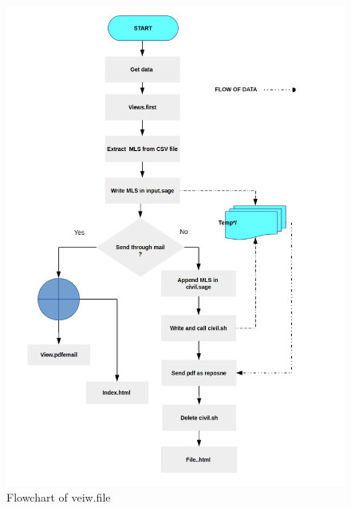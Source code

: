 \begin{figure}[H]
\centering \includegraphics[scale=0.27]{images/flowchartfile.png}
\caption{Flowchart of veiw.file}
\label{fig:FD3}
\end{figure}
